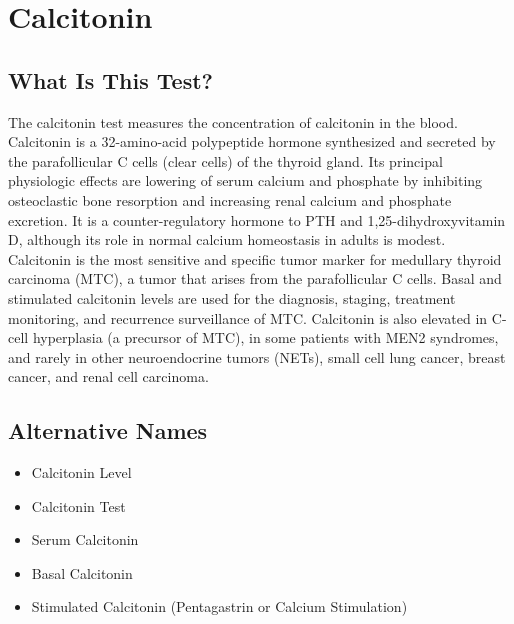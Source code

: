 \chapter{Calcitonin}

\section*{What Is This Test?}
The calcitonin test measures the concentration of calcitonin in the blood. Calcitonin is a 32-amino-acid polypeptide hormone synthesized and secreted by the parafollicular C cells (clear cells) of the thyroid gland. Its principal physiologic effects are lowering of serum calcium and phosphate by inhibiting osteoclastic bone resorption and increasing renal calcium and phosphate excretion. It is a counter-regulatory hormone to PTH and 1,25-dihydroxyvitamin D, although its role in normal calcium homeostasis in adults is modest. Calcitonin is the most sensitive and specific tumor marker for medullary thyroid carcinoma (MTC), a tumor that arises from the parafollicular C cells. Basal and stimulated calcitonin levels are used for the diagnosis, staging, treatment monitoring, and recurrence surveillance of MTC. Calcitonin is also elevated in C-cell hyperplasia (a precursor of MTC), in some patients with MEN2 syndromes, and rarely in other neuroendocrine tumors (NETs), small cell lung cancer, breast cancer, and renal cell carcinoma.

\section*{Alternative Names}
\begin{itemize}
  \item Calcitonin Level
  \item Calcitonin Test
  \item Serum Calcitonin
  \item Basal Calcitonin
  \item Stimulated Calcitonin (Pentagastrin or Calcium Stimulation)
\end{itemize}
